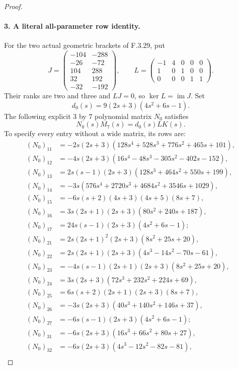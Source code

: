 \begin{proof}
\paragraph{3. A literal all-parameter row identity.}
For the two actual geometric brackets of F.3.29, put
\[
 J=\begin{pmatrix}
 -104&-288\\-26&-72\\104&288\\32&192\\-32&-192
 \end{pmatrix},\qquad
 L=\begin{pmatrix}-1&4&0&0&0\\1&0&1&0&0\\0&0&0&1&1\end{pmatrix}.
\]
Their ranks are two and three and $LJ=0$, so
$\ker L=\operatorname{im}J$.
Set
\[
                 d_0(s)=9(2s+3)(4s^2+6s-1).
\]
The following explicit $3$ by $7$ polynomial matrix
$N_0$ satisfies
\[
                    N_0(s)M_7(s)=d_0(s)LK(s).              \tag{UC.5}
\]
To specify every entry without a wide matrix, its rows are:
\begin{align*}
 (N_0)_{11}&=-2s(2s+3)(128s^4+528s^3+776s^2+465s+101),\\
 (N_0)_{12}&=-4s(2s+3)(16s^4-48s^3-305s^2-402s-152),\\
 (N_0)_{13}&=2s(s-1)(2s+3)(128s^3+464s^2+550s+199),\\
 (N_0)_{14}&=-3s(576s^4+2720s^3+4684s^2+3546s+1029),\\
 (N_0)_{15}&=-6s(s+2)(4s+3)(4s+5)(8s+7),\\
 (N_0)_{16}&=3s(2s+1)(2s+3)(80s^2+240s+187),\\
 (N_0)_{17}&=24s(s-1)(2s+3)(4s^2+6s-1);\\[2pt]
 (N_0)_{21}&=2s(2s+1)^2(2s+3)(8s^2+25s+20),\\
 (N_0)_{22}&=2s(2s+1)(2s+3)(4s^3-14s^2-70s-61),\\
 (N_0)_{23}&=-4s(s-1)(2s+1)(2s+3)(8s^2+25s+20),\\
 (N_0)_{24}&=3s(2s+3)(72s^3+232s^2+224s+69),\\
 (N_0)_{25}&=6s(s+2)(2s+1)(2s+3)(8s+7),\\
 (N_0)_{26}&=-3s(2s+3)(40s^3+140s^2+146s+37),\\
 (N_0)_{27}&=-6s(s-1)(2s+3)(4s^2+6s-1);\\[2pt]
 (N_0)_{31}&=-6s(2s+3)(16s^3+66s^2+80s+27),\\
 (N_0)_{32}&=-6s(2s+3)(4s^3-12s^2-82s-81),\\

\end{align*}
\end{proof}
